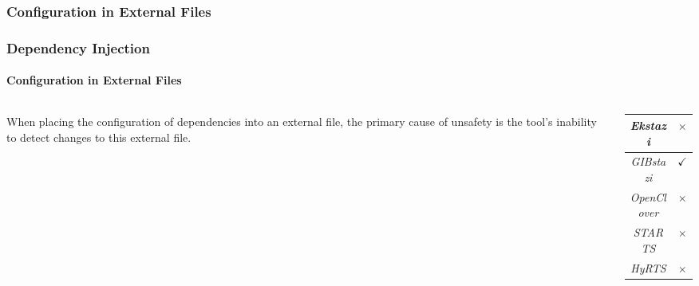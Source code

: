 \documentclass[notes,aspectratio=169]{beamer}
\makeatletter
\newcommand{\warn}{\raisebox{0.325ex}{\resizebox{!}{1.2ex}{\warning}}}
\newcommand{\suc}[1]{\textcolor{green!50!black}{\emph{#1}} & \textcolor{green!50!black}{$\checkmark$} \\}
\newcommand{\fail}[1]{\textcolor{red!50!black}{\emph{#1}} & \textcolor{red!50!black}{$\times$ }\\}
\newcommand{\timer}[1]{\note{S:\@#1:00\\}}
\makeatother
\begin{document}
\subsubsection{Configuration in External Files}
\begin{subframe}
   \frametitle{Dependency Injection}
   \framesubtitle{Configuration in External Files}
   \begin{columns}
      \begin{column}{0.6\textwidth}
         When placing the configuration of dependencies into an external file, the primary cause of unsafety is the tool's
         inability to detect changes to this external file.
      \end{column}

      \begin{column}{0.3\textwidth}
         \begin{tabular}{|c|c|}
            \hline
            \fail{Ekstazi}
            \hline
            \suc{GIBstazi}
            \hline
            \fail{OpenClover}
            \hline
            \fail{STARTS}
            \hline
            \fail{HyRTS}
            \hline
         \end{tabular}
      \end{column}
   \end{columns}
   \timer{10}
\end{subframe}
\end{document}
